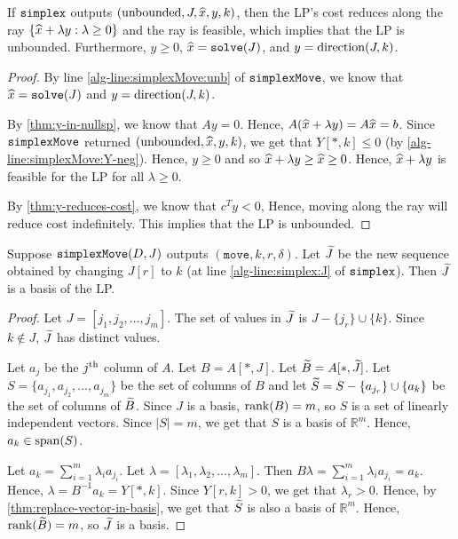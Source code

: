 \begin{theorem}
\label{thm:simplex-unbounded}
If $\operatorname{\mathtt{simplex}}$ outputs $(\textrm{unbounded}, J, \widehat{x}, y, k)$,
then the LP's cost reduces along the ray $\{\widehat{x} + \lambda y: \lambda \ge 0\}$
and the ray is feasible, which implies that the LP is unbounded.
Furthermore, $y \ge 0$, $\widehat{x} = \operatorname{\mathtt{solve}}(J)$, and $y = \operatorname{direction}(J, k)$.
\end{theorem}
\begin{proof}
By line \cref{alg-line:simplexMove:unb} of $\operatorname{\mathtt{simplexMove}}$,
we know that $\widehat{x} = \operatorname{\mathtt{solve}}(J)$ and $y = \operatorname{direction}(J, k)$.

By \cref{thm:y-in-nullsp}, we know that $Ay = 0$.
Hence, $A(\widehat{x} + \lambda y) = A\widehat{x} = b$.
Since $\operatorname{\mathtt{simplexMove}}$ returned $(\textrm{unbounded}, \widehat{x}, y, k)$,
we get that $Y[*,k] \le 0$ (by \cref{alg-line:simplexMove:Y-neg}).
Hence, $y \ge 0$ and so $\widehat{x} + \lambda y \ge \widehat{x} \ge 0$.
Hence, $\widehat{x} + \lambda y$ is feasible for the LP for all $\lambda \ge 0$.

By \cref{thm:y-reduces-cost}, we know that $c^Ty < 0$,
Hence, moving along the ray will reduce cost indefinitely.
This implies that the LP is unbounded.
\end{proof}

\begin{lemma}
\label{thm:simplex-new-basis}
Suppose $\operatorname{\mathtt{simplexMove}}(D, J)$ outputs $(\mathtt{move}, k, r, \delta)$.
Let $\widetilde{J}$ be the new sequence obtained by changing $J[r]$ to $k$
(at line \ref{alg-line:simplex:J} of $\operatorname{\mathtt{simplex}}$).
Then $\widetilde{J}$ is a basis of the LP.
\end{lemma}
\begin{proof}
Let $J = [j_1, j_2, \ldots, j_m]$.
The set of values in $\widetilde{J}$ is $J - \{j_r\} \cup \{k\}$.
Since $k \not\in J$, $\widetilde{J}$ has distinct values.

Let $a_j$ be the $j^{\textrm{th}}$ column of $A$. Let $B = A[*,J]$. Let $\widetilde{B} = A[*,\widetilde{J}]$.
Let $S = \{a_{j_1}, a_{j_2}, \ldots, a_{j_m}\}$ be the set of columns of $B$
and let $\widetilde{S} = S - \{a_{j_r}\} \cup \{a_k\}$ be the set of columns of $\widetilde{B}$.
Since $J$ is a basis, $\operatorname{rank}(B) = m$, so $S$ is a set of linearly independent vectors.
Since $|S| = m$, we get that $S$ is a basis of $\mathbb{R}^m$. Hence, $a_k \in \operatorname{span}(S)$.

Let $a_k = \sum_{i=1}^m \lambda_i a_{j_i}$. Let $\lambda = [\lambda_1, \lambda_2, \ldots, \lambda_m]$.
Then $B\lambda = \sum_{i=1}^m \lambda_i a_{j_i} = a_k$.
Hence, $\lambda = B^{-1}a_k = Y[*,k]$.
Since $Y[r,k] > 0$, we get that $\lambda_r > 0$.
Hence, by \cref{thm:replace-vector-in-basis}, we get that
$\widetilde{S}$ is also a basis of $\mathbb{R}^m$.
Hence, $\operatorname{rank}(\widetilde{B}) = m$, so $\widetilde{J}$ is a basis.
\end{proof}

